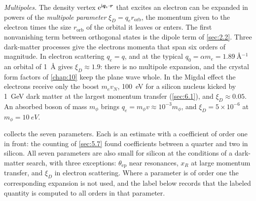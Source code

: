 \emph{Multipoles.} The density vertex $\mathrm{e}^{\mathrm{i}\bm{q}_e\cdot\bm{r}}$ that excites an electron can be expanded in powers of the \emph{multipole parameter} $\xi_D = q_e r_{\mathrm{orb}}$, the momentum given to the electron times the size $r_{\mathrm{orb}}$ of the orbital it leaves or enters. The first nonvanishing term between orthogonal states is the dipole term of \cref{sec:2.2}. Three dark-matter processes give the electrons momenta that span six orders of magnitude. In electron scattering $q_e = q$, and at the typical $q_0 = \alpha m_e = \SI{1.89}{\angstrom^{-1}}$ an orbital of \SI{1}{\angstrom} gives $\xi_D \approx 1.9$: there is no multipole expansion, and the crystal form factors of \cref{chap:10} keep the plane wave whole. In the Migdal effect the electrons receive only the boost $m_e v_N$, \SI{100}{eV} for a silicon nucleus kicked by \SI{1}{GeV} dark matter at the largest momentum transfer (\cref{sec:6.1}), and $\xi_D \approx 0.05$. An absorbed boson of mass $m_\phi$ brings $q_e = m_\phi v \approx 10^{-3}m_\phi$, and $\xi_D = 5\times10^{-6}$ at $m_\phi = \SI{10}{eV}$.

 collects the seven parameters. Each is an estimate with a coefficient of order one in front: the counting of \cref{sec:5.7} found coefficients between a quarter and two in silicon. All seven parameters are also small for silicon at the conditions of a dark-matter search, with three exceptions: $\theta_{\mathrm{ep}}$ near resonances, $x_R$ at large momentum transfer, and $\xi_D$ in electron scattering. Where a parameter is of order one the corresponding expansion is not used, and the label below records that the labeled quantity is computed to all orders in that parameter.

